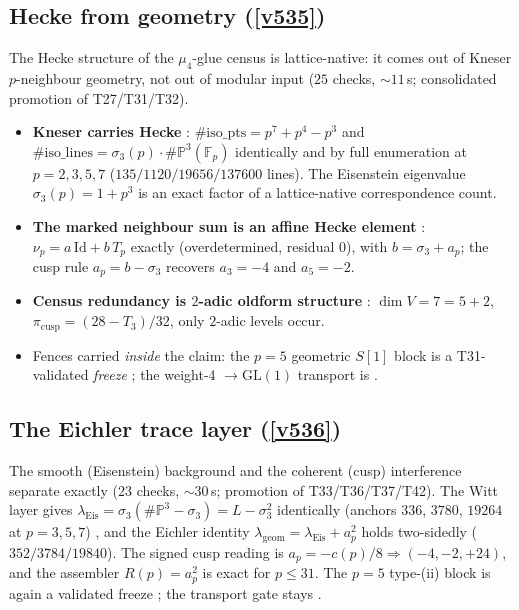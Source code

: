 \documentclass[11pt,a4paper]{article}
\newcommand{\PP}{\mathbb P}
\begin{document}
\subsection{Hecke from geometry (\texorpdfstring{\vref{v535}}{v535})}
The Hecke structure of the $\mu_4$-glue census is lattice-native: it comes out of Kneser
$p$-neighbour geometry, not out of modular input 
($25$ checks, ${\sim}11$\,s; consolidated promotion of T27/T31/T32).

\begin{itemize}[leftmargin=1.5em]
\item \textbf{Kneser carries Hecke} \mE: $\#\mathrm{iso\_pts}=p^7+p^4-p^3$ and
$\#\mathrm{iso\_lines}=\sigma_3(p)\cdot\#\PP^3(\mathbb F_p)$ identically and by full enumeration at
$p=2,3,5,7$ ($135/1120/19656/137600$ lines). The Eisenstein eigenvalue $\sigma_3(p)=1+p^3$ is an exact
factor of a lattice-native correspondence count.
\item \textbf{The marked neighbour sum is an affine Hecke element} \mE:
$\nu_p=a\,\mathrm{Id}+b\,T_p$ exactly (overdetermined, residual $0$), with $b=\sigma_3+a_p$; the cusp
rule $a_p=b-\sigma_3$ recovers $a_3=-4$ and $a_5=-2$.
\item \textbf{Census redundancy is $2$-adic oldform structure} \mE: $\dim V=7=5+2$,
$\pi_{\mathrm{cusp}}=(28-T_3)/32$, only $2$-adic levels occur.
\item Fences carried \emph{inside} the claim: the $p=5$ geometric $S[1]$ block is a T31-validated
\emph{freeze} \mC; the weight-4 $\to\mathrm{GL}(1)$ transport is \mO.
\end{itemize}

\subsection{The Eichler trace layer (\texorpdfstring{\vref{v536}}{v536})}
The smooth (Eisenstein) background and the coherent (cusp) interference separate exactly
 ($23$ checks, ${\sim}30$\,s; promotion of T33/T36/T37/T42).
The Witt layer gives $\lambda_{\mathrm{Eis}}=\sigma_3(\#\PP^3-\sigma_3)=L-\sigma_3^2$ identically
(anchors $336$, $3780$, $19264$ at $p=3,5,7$) \mE, and the Eichler identity
$\lambda_{\mathrm{geom}}=\lambda_{\mathrm{Eis}}+a_p^2$ holds two-sidedly ($352/3784/19840$). The signed
cusp reading is $a_p=-c(p)/8\Rightarrow(-4,-2,+24)$, and the assembler $R(p)=a_p^2$ is exact for
$p\le31$. The $p=5$ type-(ii) block is again a validated freeze \mC; the transport gate stays \mO.
\end{document}
